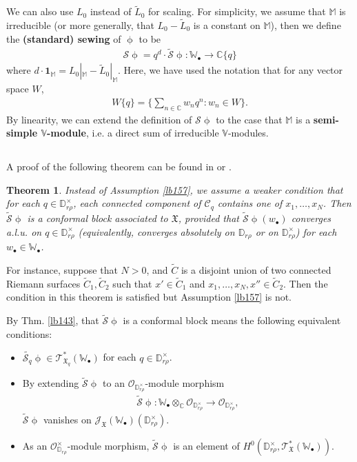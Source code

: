 \documentclass[12pt,a4paper,notitlepage]{article}
\theoremstyle{definition}
\theoremstyle{plain}
\newtheorem{thm}[df]{Theorem}
\newcommand{\fk}{\mathfrak}
\newcommand{\mc}{\mathcal}
\newcommand{\wtd}{\widetilde}
\newcommand{\id}{\mathbf{1}}
\newcommand{\scr}{\mathscr}
\newcommand{\blt}{\bullet}
\newcommand{\Vbb}{\mathbb V}
\newcommand{\Wbb}{\mathbb W}
\newcommand{\Mbb}{\mathbb M}
\newcommand{\Cbb}{\mathbb C}
\newcommand{\Dbb}{\mathbb D}
\numberwithin{equation}{section}
\begin{document}
We can also use $L_0$ instead of $\wtd L_0$ for scaling. For simplicity, we assume that $\Mbb$ is irreducible (or more generally, that $L_0-\wtd L_0$ is a constant on $\Mbb$), then we define the \textbf{(standard) sewing} of $\upphi$ to be \index{S@$\mc S\upphi$, the standard sewing}
\begin{align}
\mc S\upphi=q^d\cdot\wtd{\mc S}\upphi:\Wbb_\blt\rightarrow\Cbb\{q\} 
\end{align} 
where $d\cdot \id_\Mbb=L_0|_\Mbb-\wtd L_0|_\Mbb$. Here, we have used the notation that for any vector space $W$, 
\begin{align*}
W\{q\}=\Big\{\sum_{n\in\Cbb} w_nq^n:w_n\in W\Big\}.
\end{align*}
By linearity, we can extend the definition of $\mc S\upphi$ to the case that $\Mbb$ is a \textbf{semi-simple $\Vbb$-module},  i.e. a direct sum of irreducible $\Vbb$-modules.


\subsection{}

A proof of the following theorem can be found in \cite[Sec. 3.3]{Gui} or \cite[Sec. 10, 11]{Gui20}.

\begin{thm}\label{lb159}
Instead of Assumption \ref{lb157}, we assume a weaker condition that for each $q\in\Dbb_{r\rho}^\times$, each connected component of $\mc C_q$ contains one of $x_1,\dots,x_N$. Then $\wtd{\mc S}\upphi$ is a conformal block associated to $\fk X$, provided that  $\wtd{\mc S}\upphi(w_\blt)$ converges a.l.u. on $q\in\Dbb_{r\rho}^\times$ (equivalently, converges absolutely on $\Dbb_{r\rho}$ or on $\Dbb_{r\rho}^\times$) for each $w_\blt\in\Wbb_\blt$.
\end{thm}

For instance, suppose that $N>0$, and $\wtd C$ is a disjoint union of two connected Riemann surfaces $\wtd C_1,\wtd C_2$ such that  $x'\in\wtd C_1$ and $x_1,\dots,x_N,x''\in\wtd C_2$. Then the condition in this theorem is satisfied but Assumption \ref{lb157} is not.

By Thm. \ref{lb143}, that $\wtd{\mc S}\upphi$ is a conformal block means the following equivalent conditions:
\begin{itemize}
\item $\wtd{\mc S_q}\upphi\in \scr T_{\fk X_q}^*(\Wbb_\blt)$ for each $q\in\Dbb_{r\rho}^\times$.
\item By extending $\wtd{\mc S}\upphi$  to an $\scr O_{\Dbb_{r\rho}^\times}$-module morphism
\begin{align}
\wtd{\mc S}\upphi:\Wbb_\blt\otimes_\Cbb\scr O_{\Dbb_{r\rho}^\times}\rightarrow \scr O_{\Dbb_{r\rho}^\times},\label{eq248}
\end{align}
$\wtd{\mc S}\upphi$ vanishes on $\scr J_{\fk X}(\Wbb_\blt)(\Dbb_{r\rho}^\times)$.
\item As an $\scr O_{\Dbb_{r\rho}}^\times$-module morphism, $\wtd{\mc S}\upphi$ is an element of $H^0(\Dbb_{r\rho}^\times,\scr T_{\fk X}^*(\Wbb_\blt))$.
\end{itemize}
\end{document}
